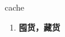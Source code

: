 
\begin{frame}
{\huge cache}
\begin{center}
\begin{enumerate}\Large
  \item \textbf{囤货，藏货}
\end{enumerate}
\end{center}
\end{frame}
